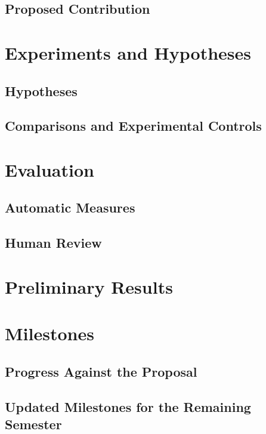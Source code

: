 \documentclass[10pt,letterpaper]{article}
\begin{document}
\subsection{Proposed Contribution}
\vspace*{0.55in}
\section{Experiments and Hypotheses}
\subsection{Hypotheses}
\vspace*{0.55in}
\subsection{Comparisons and Experimental Controls}
\vspace*{0.55in}
\section{Evaluation}
\subsection{Automatic Measures}
\vspace*{0.45in}
\subsection{Human Review}

\clearpage
\section{Preliminary Results}
\vspace*{0.65in}
\section{Milestones}
\subsection{Progress Against the Proposal}
\vspace*{0.65in}
\subsection{Updated Milestones for the Remaining Semester}
\vspace*{0.65in}

\end{document}
